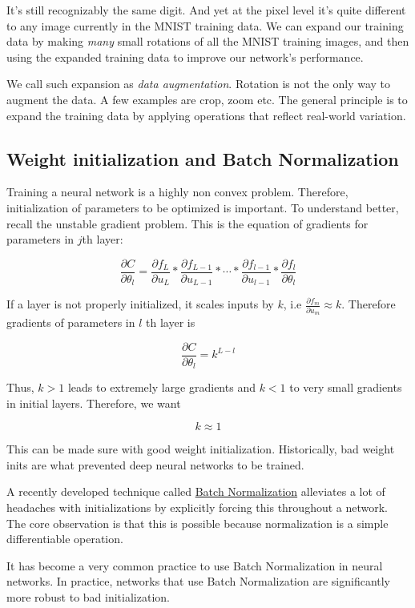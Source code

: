 \documentclass[a4paper]{tufte-handout}
\begin{document}
It's still recognizably the same digit. And yet at the pixel level it's
quite different to any image currently in the MNIST training data. We
can expand our training data by making \emph{many} small rotations of
all the MNIST training images, and then using the expanded training data
to improve our network's performance.

We call such expansion as \emph{data augmentation}. Rotation is not the
only way to augment the data. A few examples are crop, zoom etc. The
general principle is to expand the training data by applying operations
that reflect real-world variation.

\subsection{Weight initialization and Batch
Normalization}\label{weight-initialization-and-batch-normalization}

Training a neural network is a highly non convex problem. Therefore,
initialization of parameters to be optimized is important. To understand
better, recall the unstable gradient problem. This is the equation of
gradients for parameters in \(j\)th layer:

\[\frac{\partial C}{\partial \theta_l} = \frac{\partial f_L}{\partial u_L} * \frac{\partial f_{L-1}}{\partial u_{L-1}} * \cdots * \frac{\partial f_{l-1}}{\partial u_{l-1}} * \frac{\partial f_l}{\partial \theta_l}\]

If a layer is not properly initialized, it scales inputs by \(k\), i.e
\(\frac{\partial f_m}{\partial u_m} \approx k\). Therefore gradients of
parameters in \(l\) th layer is

\[\frac{\partial C}{\partial \theta_l} = k^{L - l}\]

Thus, \(k > 1\) leads to extremely large gradients and \(k<1\) to very
small gradients in initial layers. Therefore, we want

\[k \approx 1\]

This can be made sure with good weight initialization. Historically, bad
weight inits are what prevented deep neural networks to be trained.

A recently developed technique called
\href{http://arxiv.org/abs/1502.03167}{Batch Normalization} alleviates a
lot of headaches with initializations by explicitly forcing this
throughout a network. The core observation is that this is possible
because normalization is a simple differentiable operation.

It has become a very common practice to use Batch Normalization in
neural networks. In practice, networks that use Batch Normalization are
significantly more robust to bad initialization.
\end{document}
